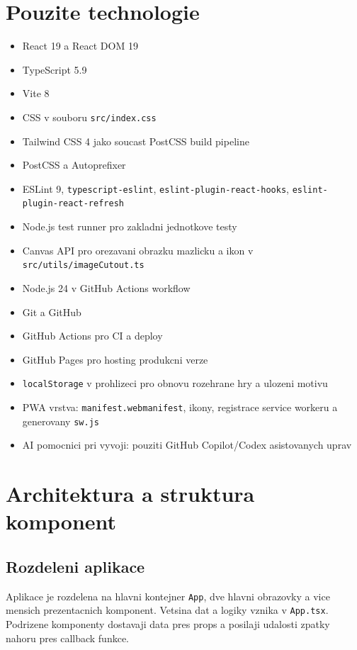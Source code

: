 \documentclass[12pt,a4paper]{article}
\begin{document}
\section{Pouzite technologie}

\begin{itemize}[leftmargin=2em]
  \item React 19 a React DOM 19
  \item TypeScript 5.9
  \item Vite 8
  \item CSS v souboru \texttt{src/index.css}
  \item Tailwind CSS 4 jako soucast PostCSS build pipeline
  \item PostCSS a Autoprefixer
  \item ESLint 9, \texttt{typescript-eslint}, \texttt{eslint-plugin-react-hooks}, \texttt{eslint-plugin-react-refresh}
  \item Node.js test runner pro zakladni jednotkove testy
  \item Canvas API pro orezavani obrazku mazlicku a ikon v \texttt{src/utils/imageCutout.ts}
  \item Node.js 24 v GitHub Actions workflow
  \item Git a GitHub
  \item GitHub Actions pro CI a deploy
  \item GitHub Pages pro hosting produkcni verze
  \item \texttt{localStorage} v prohlizeci pro obnovu rozehrane hry a ulozeni motivu
  \item PWA vrstva: \texttt{manifest.webmanifest}, ikony, registrace service workeru a generovany \texttt{sw.js}
  \item AI pomocnici pri vyvoji: pouziti GitHub Copilot/Codex asistovanych uprav
\end{itemize}

\section{Architektura a struktura komponent}

\subsection*{Rozdeleni aplikace}

Aplikace je rozdelena na hlavni kontejner \texttt{App}, dve hlavni obrazovky a vice mensich prezentacnich komponent. Vetsina dat a logiky vznika v \texttt{App.tsx}. Podrizene komponenty dostavaji data pres props a posilaji udalosti zpatky nahoru pres callback funkce.
\end{document}
